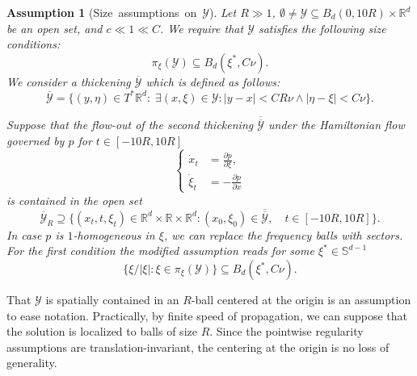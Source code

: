 \documentclass{amsart}
\newtheorem{assumption}[theorem]{Assumption}
\theoremstyle{definition}
\newcommand{\R}{\mathbb{R}}
\begin{document}
\begin{assumption}[Size~assumptions~on~$\mathcal{Y}$]
\label{ass:RegularitySet}
Let $R \gg 1$, $\emptyset \neq \mathcal{Y} \subseteq B_d(0,10 R) \times \R^d$ be an open set, and $c \ll 1 \ll C$. We require that $\mathcal{Y}$ satisfies the following size 
conditions:
\begin{equation*}
    \pi_{\xi}(\mathcal{Y}) \subseteq B_d(\xi^*, C \nu).
\end{equation*}
We consider a thickening $\overline{\mathcal{Y}}$ which is defined as follows:
\begin{equation*}
    \overline{\mathcal{Y}} = \{ (y,\eta) \in T^* \R^d : \; \exists (x,\xi) \in \mathcal{Y} : |y-x| < C R \nu \wedge |\eta - \xi | < C \nu \}.
\end{equation*}

Suppose that the flow-out of the second thickening $\overline{\overline{\mathcal{Y}}}$ under the Hamiltonian flow governed by $p$ for $t \in [-10R,10R]$
\begin{equation}
\left\{ \begin{array}{cl}
\label{eq:RescaledHamiltonianFlowAssumptions}
\dot{x}_t &= \frac{\partial p}{\partial \xi}, \\
\dot{\xi}_t &= - \frac{\partial p}{\partial x}
\end{array} \right.
\end{equation}
is contained in the open set
\begin{equation*}
\overline{\mathcal{Y}}_R \supseteq \{(x_t,t,\xi_t) \in \R^{d} \times \R \times \R^d : (x_0,\xi_0) \in \overline{\overline{\mathcal{Y}}}, \quad t \in [-10R,10R] \}.
\end{equation*}
In case $p$ is $1$-homogeneous in $\xi$, we can replace the frequency balls with sectors. For the first condition the modified assumption reads for some $\xi^* \in \mathbb{S}^{d-1}$
\begin{equation*}
    \{ \xi / |\xi| : \xi \in \pi_{\xi}(\mathcal{Y}) \} \subseteq B_d(\xi^*, C \nu).
\end{equation*}
\end{assumption}

That $\mathcal{Y}$ is spatially contained in an $R$-ball centered at the origin is an assumption to ease notation. Practically, by finite speed of propagation, we can suppose that the solution is localized to balls of size $R$. Since the pointwise regularity assumptions are translation-invariant, the centering at the origin is no loss of generality.
\end{document}
